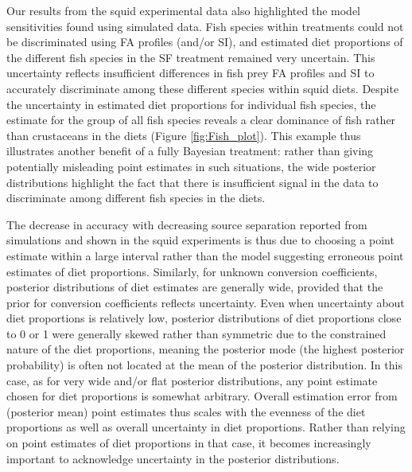 \documentclass[fleqn,10pt]{wlpeerj}
\begin{document}
Our results from the squid experimental data also highlighted the model
sensitivities found using simulated data. Fish species within treatments could
not be discriminated using FA profiles (and/or SI), and estimated diet
proportions of the different fish species in the SF treatment remained
very uncertain. This uncertainty reflects insufficient differences in fish prey FA profiles and SI to accurately discriminate among these different species within squid diets. Despite the uncertainty in estimated diet proportions for
individual fish species, the estimate for the group of all
fish species reveals a clear dominance of
fish rather than crustaceans in the diets (Figure \ref{fig:Fish_plot}). This example thus illustrates another
benefit of a fully Bayesian treatment: rather than giving
potentially misleading point estimates in such situations, the wide
posterior distributions highlight the fact that there is insufficient signal in the
data to discriminate among different fish species in the diets. 

The decrease in accuracy with decreasing source separation reported from simulations and shown in the
squid experiments is thus due to choosing a point estimate within a
large interval rather
than the model suggesting erroneous point estimates of diet proportions. Similarly, for unknown conversion coefficients, posterior
distributions of diet estimates are generally wide, provided that the
prior for conversion coefficients reflects uncertainty. Even when
uncertainty about diet proportions is relatively low, posterior distributions of diet proportions close to 0 or
1 were generally skewed rather than symmetric due to the constrained nature of the diet
proportions, meaning the posterior
mode (the highest posterior probability) is often not located at the
mean of the posterior distribution. In this case, as for very wide and/or flat
posterior distributions, any point estimate
chosen for diet proportions is somewhat arbitrary. Overall estimation error from (posterior mean) point
estimates thus scales with the evenness of the diet proportions as
well as overall uncertainty in diet proportions. Rather than relying on point estimates of diet proportions in that case,
it becomes increasingly important to acknowledge uncertainty in the
posterior distributions.
\end{document}
